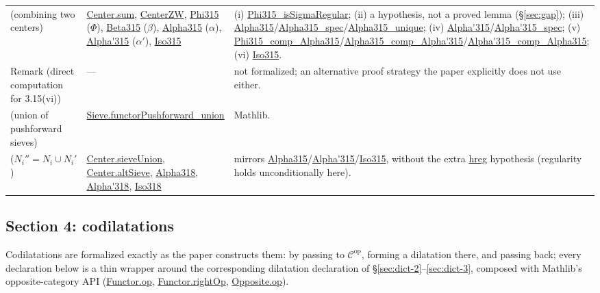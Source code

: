 \documentclass[11pt]{amsart}
\newcommand{\lc}[1]{\url{#1}}
\theoremstyle{plain}
\theoremstyle{definition}
\theoremstyle{remark}
\newcommand{\calC}{\mathcal C}
\newcommand{\op}{\ensuremath{\mathrm{op}}}
\begin{document}
\begin{longtable}{@{}p{2.55cm}p{4.1cm}p{4.75cm}@{}}
\citep[Proposition~3.15]{Mayeux} (combining two centers) & \lc{Center.sum}, \lc{CenterZW}, \lc{Phi315} ($\Phi$), \lc{Beta315} ($\beta$), \lc{Alpha315} ($\alpha$), \lc{Alpha'315} ($\alpha'$), \lc{Iso315} & (i) \lc{Phi315_isSigmaRegular}; (ii) a hypothesis, not a proved lemma (\S\ref{sec:gap}); (iii) \lc{Alpha315}/\lc{Alpha315_spec}/\lc{Alpha315_unique}; (iv) \lc{Alpha'315}/\lc{Alpha'315_spec}; (v) \lc{Phi315_comp_Alpha315}/\lc{Alpha315_comp_Alpha'315}/\lc{Alpha'315_comp_Alpha315}; (vi) \lc{Iso315}. \\
Remark (direct computation for 3.15(vi)) & --- & not formalized; an alternative proof strategy the paper explicitly does not use either. \\
\citep[Fact~3.17]{Mayeux} (union of pushforward sieves) & \lc{Sieve.functorPushforward_union} & Mathlib. \\
\citep[Proposition~3.18]{Mayeux} ($N_i''=N_i\cup N_i'$) & \lc{Center.sieveUnion}, \lc{Center.altSieve}, \lc{Alpha318}, \lc{Alpha'318}, \lc{Iso318} & mirrors \lc{Alpha315}/\lc{Alpha'315}/\lc{Iso315}, without the extra \lc{hreg} hypothesis (regularity holds unconditionally here). \\
\end{longtable}
\endgroup

\subsection{Section 4: codilatations}
\label{sec:dict-4}

Codilatations are formalized exactly as the paper constructs them: by passing to $\calC^{\op}$,
forming a dilatation there, and passing back; every declaration below is a thin wrapper around
the corresponding dilatation declaration of \S\ref{sec:dict-2}--\ref{sec:dict-3}, composed with
Mathlib's opposite-category API (\lc{Functor.op}, \lc{Functor.rightOp}, \lc{Opposite.op}).
\end{document}
